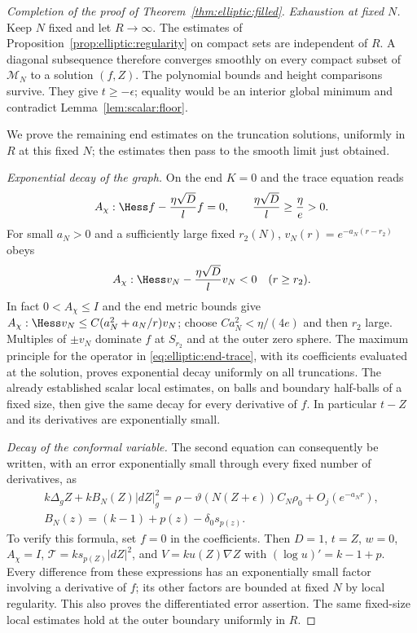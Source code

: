 \begin{proof}[Completion of the proof of Theorem~\ref{thm:elliptic:filled}]
\emph{Exhaustion at fixed $N$.} Keep $N$ fixed and let $R\to\infty$.  The estimates of
Proposition~\ref{prop:elliptic:regularity} on compact sets are
independent of $R$.  A diagonal subsequence therefore converges
smoothly on every compact subset of $\mathcal M_N$ to a solution
$(f,Z)$.  The polynomial bounds and height comparisons survive.
They give $t\ge-\epsilon$; equality would be an interior global
minimum and contradict Lemma~\ref{lem:scalar:floor}.

We prove the remaining end estimates on the truncation solutions,
uniformly in $R$ at this fixed $N$; the estimates then pass to the
smooth limit just obtained.

\medskip\noindent\emph{Exponential decay of the graph.}
On the end $K=0$ and the trace equation reads
\begin{equation}\label{eq:elliptic:end-trace}
 A_\chi:\Hess f-\frac{\eta\sqrt D}{l}f=0,
 \qquad \frac{\eta\sqrt D}{l}\ge\frac\eta e>0.
\end{equation}
For small $a_N>0$ and a sufficiently large fixed $r_2(N)$,
$v_N(r)=e^{-a_N(r-r_2)}$ obeys
\[
 A_\chi:\Hess v_N-\frac{\eta\sqrt D}{l}v_N<0
 \quad(r\ge r_2).
\]
In fact $0<A_\chi\le I$ and the end metric bounds give
$A_\chi:\Hess v_N\le C(a_N^2+a_N/r)v_N$; choose
$Ca_N^2<\eta/(4e)$ and then $r_2$ large.  Multiples of $\pm v_N$
dominate $f$ at $S_{r_2}$ and at the outer zero sphere.  The maximum
principle for the operator in \eqref{eq:elliptic:end-trace},
with its coefficients evaluated at the solution, proves exponential
decay uniformly on all truncations.  The already established scalar
local estimates, on balls and boundary half-balls of a fixed size,
then give the same decay for every derivative of $f$.
In particular $t-Z$ and its derivatives are exponentially small.

\medskip\noindent\emph{Decay of the conformal variable.}
The second equation can consequently be written, with an error
exponentially small through every fixed number of derivatives, as
\begin{equation}\label{eq:elliptic:end-equation}
\begin{gathered}
 k\Delta_g Z+k B_N(Z)|dZ|_g^2
 =\rho-\vartheta(N(Z+\epsilon))C_N\rho_0+O_j(e^{-a_Nr}),\\
 B_N(z)=(k-1)+p(z)-\delta_0s_{p(z)}.
\end{gathered}
\end{equation}
To verify this formula, set $f=0$ in the coefficients.  Then
$D=1$, $t=Z$, $w=0$, $A_\chi=I$,
$\mathcal T=ks_{p(Z)}|dZ|^2$, and
$V=ku(Z)\nabla Z$ with $(\log u)'=k-1+p$.
Every difference from these expressions has an exponentially small
factor involving a derivative of $f$; its other factors are bounded
at fixed $N$ by local regularity.  This also proves the differentiated
error assertion.  The same fixed-size local estimates hold at the
outer boundary uniformly in $R$.


\end{proof}
